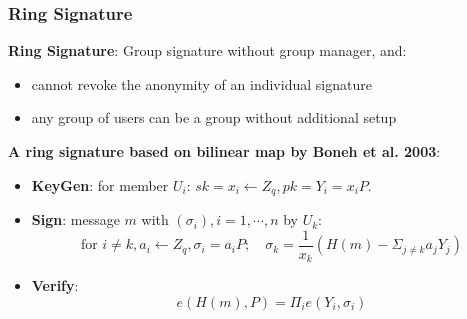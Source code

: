 \begin{frame}\frametitle{Ring Signature}
\textbf{Ring Signature}: Group signature without group manager, and:
\begin{itemize}
\item cannot revoke the anonymity of an individual signature
\item any group of users can be a group without additional setup
\end{itemize}
\textbf{A ring signature based on bilinear map by Boneh et al. 2003}:\\
\begin{itemize}
\item \textbf{KeyGen}: for member $U_i$: $sk=x_i \gets Z_q, pk = Y_i = x_iP$.
\item \textbf{Sign}: message $m$ with $(\sigma_i), i=1,\cdots, n$ by $U_k$:
\[\text{for } i\neq k, a_i \gets Z_q, \sigma_i = a_iP;\quad \sigma_k = \frac{1}{x_k}(H(m)-\Sigma_{j\neq k}a_jY_j)\]
\item \textbf{Verify}:
\[ e(H(m),P) = \Pi_ie(Y_i, \sigma_i) \]
\end{itemize}
\end{frame}
